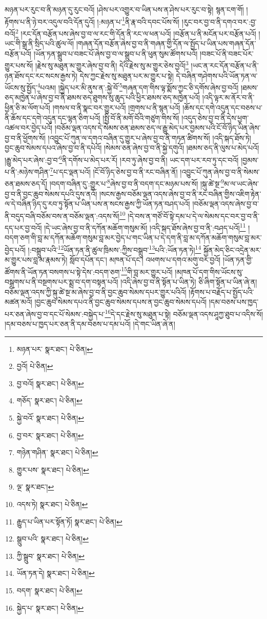 མཉན་པར་རུང་བ་ནི་མཉན་དུ་རུང་བའོ། །ཤེས་པར་འགྱུར་བ་ཡིན་པས་ན་ཤེས་པར་རུང་བ་སྟེ། སྙན་ངག་གོ། །རྟོགས་པ་ནི་ཉེ་བར་འདུལ་བའི་དོན་དུའོ། །:མཉན་པ་\footnote{མཉན་པར་  སྣར་ཐང་།  པེ་ཅིན། }ནི་རྣ་བའི་དབང་པོས་སོ། །རུང་བར་བྱ་བ་ནི་དགའ་བར་:བྱ་བའོ།\footnote{བྱའོ།  པེ་ཅིན། } །རང་དོན་བརྩོན་པས་ཞེས་བྱ་བ་ལ་རང་གི་དོན་ནི་རང་ལ་ཕན་པའོ། །བརྩོན་པ་ནི་མངོན་པར་བརྩོན་པའོ། །ཡང་གི་སྒྲ་ནི་སྲིད་པའི་ཚུལ་ལོ། །གཞན་དོན་བརྩོན་ཞེས་བྱ་བ་ནི་གཞན་གྱི་དོན་ལ་སྤྱོད་པ་ཡིན་པས་གཞན་དོན་བརྩོན་པའོ། །ཡོན་ཏན་སྒྲུབ་པ་བཟང་པོ་ཞེས་བྱ་བ་ལ་སྒྲུབ་པ་ནི་ཕུན་སུམ་ཚོགས་པའོ། །བཟང་པོ་ནི་བཟང་པོར་གྱུར་པས་སོ། །རྗེས་སུ་མཐུན་མ་གྱུར་ཞེས་བྱ་བ་ནི། དེའི་རྗེས་སུ་མ་གྱུར་ཅེས་བྱའོ།\footnote{བྱ་བའོ།  སྣར་ཐང་།  པེ་ཅིན། } །ཡང་ན་རང་དོན་བརྩོན་པ་ནི་ཉན་ཐོས་དང་རང་སངས་རྒྱས་ཏེ། དེས་ཀྱང་རྗེས་སུ་མཐུན་པར་མ་གྱུར་པ་སྟེ། དེ་བཞིན་གཤེགས་པའི་ཡོན་ཏན་ལ་ཡོངས་སུ་སྤྱོད་\footnote{གཅོད་  སྣར་ཐང་།  པེ་ཅིན། }པའམ། །སྐྱེད་པར་མི་ནུས་ན་:སྐྱེ་བོ་\footnote{སྐྱེ་བའོ་  སྣར་ཐང་།  པེ་ཅིན། }གཞན་དག་གིས་ལྟ་སྨོས་ཀྱང་ཅི་དགོས་ཞེས་བྱ་བའོ། །ཐམས་ཅད་མཁྱེན་པ་ཞེས་བྱ་བ་ནི་ཐམས་ཅད་ཐུགས་སུ་ཆུད་པའི་ཕྱིར་ཐམས་ཅད་མཁྱེན་པའོ། །འདི་ལྟར་མ་ནོར་བ་ནི་ཕྱིན་ཅི་མ་ལོག་པའོ། །གསལ་བ་ནི་སྣང་བར་གྱུར་པའོ། །གྲགས་པ་ནི་སྙན་པའོ། །ཆོས་དང་དགེ་འདུན་དང་བཅས་པ་ནི་ཆོས་དང་དགེ་འདུན་དང་ལྷན་ཅིག་པའོ། །སྤྱི་བོ་ནི་མགོ་བོའི་གཙུག་གིས་སོ། །འདུད་ཅེས་བྱ་བ་ནི་དེས་ཕྱག་འཚལ་བར་བྱེད་པའོ། །བཅོམ་ལྡན་འདས་དེ་སེམས་ཅན་ཐམས་ཅད་ལ་རྒྱུ་མེད་པར་བྱམས་པའི་ངོ་བོ་ཉིད་ཡིན་ཞེས་བྱ་བ་ནི་ཕྱོགས་སོ། །འབྱུང་པོ་ཀུན་ལ་དགའ་བཞིན་དུ་གྱུར་པ་ཞེས་བྱ་བ་ནི་གཏན་ཚིགས་སོ། །འདི་སྐད་ཐོས་ཏེ། བྱང་ཆུབ་སེམས་དཔའ་ཞེས་བྱ་བ་ནི་དཔེའོ། །སེམས་ཅན་ཞེས་བྱ་བ་ནི་སྐྱེ་དགུའོ། །ཐམས་ཅད་ནི་ལུས་པ་མེད་པའོ། །རྒྱུ་མེད་པར་ཞེས་:བྱ་བ་\footnote{བྱ་བར་  སྣར་ཐང་།  པེ་ཅིན། }ནི་དགོས་པ་མེད་པར་རོ། །རབ་ཏུ་ཞེས་བྱ་བ་ནི། ཡང་དག་པར་རབ་ཏུ་དང་བའོ། །བྱམས་པ་ནི་:མཉེས་གཤིན་\footnote{གཉེན་གཤིན་  སྣར་ཐང་།  པེ་ཅིན། }པ་དང་ལྡན་པའོ། །ངོ་བོ་ཉིད་ཅེས་བྱ་བ་ནི་རང་བཞིན་ནོ། །འབྱུང་པོ་ཀུན་ཞེས་བྱ་བ་ནི་སེམས་ཅན་ཐམས་ཅད་དོ། །བདག་བཞིན་དུ་:གྱུར་པ་\footnote{གྱུར་པས་  སྣར་ཐང་།  པེ་ཅིན། }ཞེས་བྱ་བ་ནི་བདག་དང་མཉམ་པས་སོ། །སྐུ་ཚེ་སྔ་\footnote{ལྔ་  སྣར་ཐང་། }མ་ལ་ཡང་ཞེས་བྱ་བ་ནི་བྱང་ཆུབ་སེམས་དཔའི་དུས་ནའོ། །སངས་རྒྱས་བཅོམ་ལྡན་འདས་ཞེས་བྱ་བ་ནི་རང་བཞིན་གྱིས་འཇིག་རྟེན་ལ་དེ་བཞིན་ཉིད་དུ་རབ་ཏུ་སྟོན་པ་ཡིན་པས་ན་སངས་རྒྱས་ཀྱི་ཡོན་ཏན་བཤད་པའོ། །བཅོམ་ལྡན་འདས་ཞེས་བྱ་བ་ནི་བདུད་བཞི་བཅོམ་བས་ན་བཅོམ་ལྡན་:འདས་སོ།\footnote{འདས་ཏེ།  སྣར་ཐང་།  པེ་ཅིན། } །དེ་བས་ན་གཙོ་བོ་སྟེ་དམ་པ་དེ་ལ་སེམས་དང་བར་བྱ་བ་ནི་དད་པར་བྱ་བའོ། །དེ་ཡང་ཞེས་བྱ་བ་ནི་དཀོན་མཆོག་གསུམ་མོ། །འདི་སྐད་ཐོས་ཞེས་བྱ་བ་ནི་:བཤད་པའོ།\footnote{རྒྱུད་པ་ཡིན་པར་སྟོན་ཏོ།  སྣར་ཐང་།  པེ་ཅིན། } །བདག་ཅག་གི་བླ་མ་དཀོན་མཆོག་གསུམ་བླ་མར་བྱེད་པ་གང་ཡིན་པ་དེ་དག་ནི་བླ་མ་དཀོན་མཆོག་གསུམ་བླ་མར་བྱེད་པའོ། །:བསྒྲུབ་པའི་\footnote{སྒྲུབ་པའི་  སྣར་ཐང་།  པེ་ཅིན། }ཡོན་ཏན་ནི་ཚུལ་ཁྲིམས་:ཀྱིས་བསྒྲུབ་\footnote{ཀྱི་སྒྲུབ་  སྣར་ཐང་།  པེ་ཅིན། }པའི་:ཡོན་ཏན་ཏེ།\footnote{ཡོན་ཏན་དེ།  སྣར་ཐང་།  པེ་ཅིན། } སྐྱོན་མེད་ཅིང་འདྲེན་མར་མ་གྱུར་པས་བླ་མ་རྣམས་ཏེ། སློབ་དཔོན་དང་། མཁན་པོ་དང་། འཕགས་པ་དགའ་མགུ་བར་བྱའོ། །ཡོན་ཏན་གྱི་ཚོགས་ནི་ཡོན་ཏན་བསགས་པ་སྟེ་དེས་:བདག་ཅག་\footnote{བདག་  སྣར་ཐང་།  པེ་ཅིན། }གི་བླ་མར་གྱུར་པའོ། །མཁན་པོ་དག་གིས་ཡོངས་སུ་བསྒྲགས་པ་ནི་བསྔགས་པར་སྨྲ་བ་དག་བསྟན་པའོ། །འདི་ཞེས་བྱ་བ་ནི་སྟོན་པ་ཡིན་ཏེ། ཅི་ཞིག་སྟོན་པ་ཡིན་ཞེ་ན། བཅོམ་ལྡན་འདས་ཀྱི་སྐུ་ཚེ་སྔ་མ་ཞེས་བྱ་བ་ནི་བྱང་ཆུབ་སེམས་དཔར་གྱུར་པའིའོ། །རྟོགས་པ་བརྗོད་པ་སྤྱོད་པའི་མཚན་མའོ། །བྱང་ཆུབ་སེམས་དཔའ་ནི་བྱང་ཆུབ་སེམས་དཔས་ན་བྱང་ཆུབ་སེམས་དཔའོ། །དམ་བཅས་པས་ཁྱད་པར་ཅན་ཞེས་བྱ་བ་དང་པོ་སེམས་:བསྐྱེད་པ་\footnote{སྐྱེད་པ་  སྣར་ཐང་།  པེ་ཅིན། }དེ་དང་རྗེས་སུ་མཐུན་པ་སྟེ། བཅོམ་ལྡན་འདས་ཤཱཀྱ་ཐུབ་པ་འདིས་སོ། །དམ་བཅས་པ་ཁྱད་པར་ཅན་ནི་དམ་བཅས་པ་དམ་པའོ། །དེ་གང་ཡིན་ཞེ་ན། 